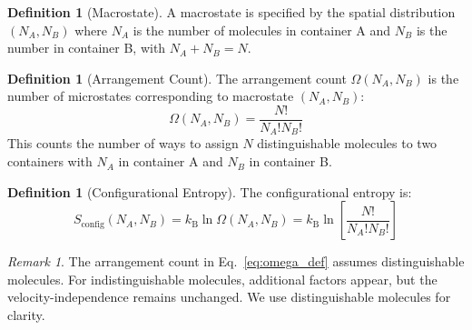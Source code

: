 \documentclass[10pt,twocolumn,letterpaper]{article}
\theoremstyle{definition}
\newtheorem{definition}[theorem]{Definition}
\theoremstyle{remark}
\newtheorem{remark}[theorem]{Remark}
\newcommand{\kb}{k_\text{B}}
\newcommand{\Om}{\Omega}
\begin{document}
\begin{definition}[Macrostate]
A macrostate is specified by the spatial distribution $(N_A, N_B)$ where $N_A$ is the number of molecules in container A and $N_B$ is the number in container B, with $N_A + N_B = N$.
\end{definition}

\begin{definition}[Arrangement Count]
The arrangement count $\Om(N_A, N_B)$ is the number of microstates corresponding to macrostate $(N_A, N_B)$:
\begin{equation}
\Om(N_A, N_B) = \frac{N!}{N_A! N_B!}
\label{eq:omega_def}
\end{equation}
This counts the number of ways to assign $N$ distinguishable molecules to two containers with $N_A$ in container A and $N_B$ in container B.
\end{definition}

\begin{definition}[Configurational Entropy]
The configurational entropy is:
\begin{equation}
S_{\text{config}}(N_A, N_B) = \kb \ln \Om(N_A, N_B) = \kb \ln\left[\frac{N!}{N_A! N_B!}\right]
\label{eq:entropy_config}
\end{equation}
\end{definition}

\begin{remark}
The arrangement count in Eq.~\eqref{eq:omega_def} assumes distinguishable molecules. For indistinguishable molecules, additional factors appear, but the velocity-independence remains unchanged. We use distinguishable molecules for clarity.
\end{remark}
\end{document}
